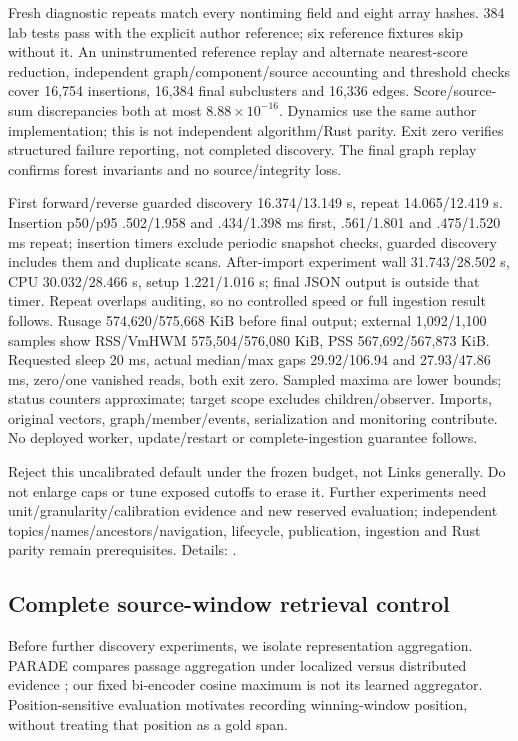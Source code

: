 \documentclass[11pt]{article}
\begin{document}
Fresh diagnostic repeats match every nontiming field and eight array hashes.
384 lab tests pass with the explicit author reference; six reference fixtures skip
without it. An uninstrumented reference replay and alternate nearest-score reduction,
independent graph/component/source accounting and threshold checks cover 16,754
insertions, 16,384 final subclusters and 16,336 edges. Score/source-sum discrepancies
both at most $8.88\times10^{-16}$. Dynamics use the same author implementation;
this is not independent algorithm/Rust parity. Exit zero verifies structured
failure reporting, not completed discovery. The final graph replay confirms forest
invariants and no source/integrity loss.

First forward/reverse guarded discovery 16.374/13.149 s, repeat 14.065/12.419 s.
Insertion p50/p95 .502/1.958 and .434/1.398 ms first, .561/1.801 and
.475/1.520 ms repeat; insertion timers exclude periodic snapshot checks, guarded
discovery includes them and duplicate scans. After-import experiment wall
31.743/28.502 s, CPU 30.032/28.466 s, setup 1.221/1.016 s; final JSON output
is outside that timer. Repeat overlaps auditing, so no controlled speed or full
ingestion result follows. Rusage 574,620/575,668 KiB before final output; external
1,092/1,100 samples show RSS/VmHWM 575,504/576,080 KiB, PSS 567,692/567,873 KiB.
Requested sleep 20 ms, actual median/max gaps 29.92/106.94 and 27.93/47.86 ms,
zero/one vanished reads, both exit zero. Sampled maxima are lower bounds; status
counters approximate; target scope excludes children/observer. Imports, original
vectors, graph/member/events, serialization and monitoring contribute. No deployed
worker, update/restart or complete-ingestion guarantee follows.

Reject this uncalibrated default under the frozen budget, not Links generally.
Do not enlarge caps or tune exposed cutoffs to erase it. Further experiments need
unit/granularity/calibration evidence and new reserved evaluation; independent
topics/names/ancestors/navigation, lifecycle, publication, ingestion and Rust
parity remain prerequisites. Details: .

\subsection{Complete source-window retrieval control}
Before further discovery experiments, we isolate representation aggregation.
PARADE compares passage aggregation under localized versus distributed evidence
\cite{li2020parade}; our fixed bi-encoder cosine maximum is not its learned
aggregator. Position-sensitive evaluation \cite{boytsov2025positional} motivates
recording winning-window position, without treating that position as a gold span.
\end{document}
